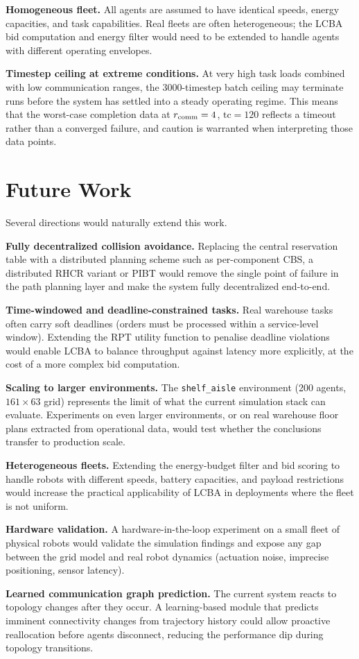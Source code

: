 \textbf{Homogeneous fleet.}
All agents are assumed to have identical speeds, energy capacities, and task
capabilities.
Real fleets are often heterogeneous; the LCBA bid computation and energy
filter would need to be extended to handle agents with different operating
envelopes.

\textbf{Timestep ceiling at extreme conditions.}
At very high task loads combined with low communication ranges, the 3000-timestep
batch ceiling may terminate runs before the system has settled into a steady
operating regime.
This means that the worst-case completion data at $r_{\text{comm}} = 4$,
$\text{tc} = 120$ reflects a timeout rather than a converged failure,
and caution is warranted when interpreting those data points.


\section{Future Work}
\label{sec:conclusion_future}

Several directions would naturally extend this work.

\textbf{Fully decentralized collision avoidance.}
Replacing the central reservation table with a distributed planning scheme such as per-component CBS, a distributed RHCR variant or PIBT would remove the
single point of failure in the path planning layer and make the system fully
decentralized end-to-end.

\textbf{Time-windowed and deadline-constrained tasks.}
Real warehouse tasks often carry soft deadlines (orders must be processed
within a service-level window).
Extending the RPT utility function to penalise deadline violations would
enable LCBA to balance throughput against latency more explicitly, at the cost
of a more complex bid computation.

\textbf{Scaling to larger environments.}
The \texttt{shelf\_aisle} environment (200 agents, $161\times63$ grid)
represents the limit of what the current simulation stack can evaluate.
Experiments on even larger environments, or on real warehouse floor plans
extracted from operational data, would test whether the conclusions
transfer to production scale.

\textbf{Heterogeneous fleets.}
Extending the energy-budget filter and bid scoring to handle robots with
different speeds, battery capacities, and payload restrictions would
increase the practical applicability of LCBA in deployments where the
fleet is not uniform.

\textbf{Hardware validation.}
A hardware-in-the-loop experiment on a small fleet of physical robots would
validate the simulation findings and expose any gap between the grid model
and real robot dynamics (actuation noise, imprecise positioning, sensor
latency).

\textbf{Learned communication graph prediction.}
The current system reacts to topology changes after they occur.
A learning-based module that predicts imminent connectivity changes
from trajectory history could allow proactive reallocation before
agents disconnect, reducing the performance dip during topology transitions.
